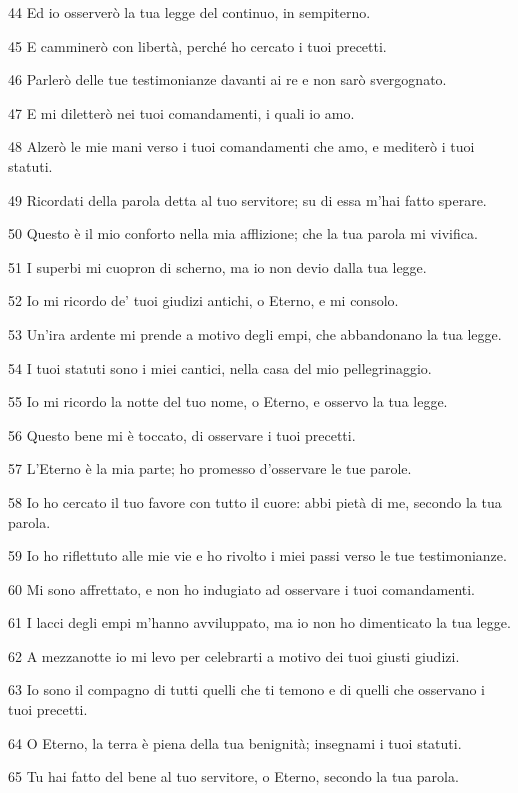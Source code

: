 \par 44 Ed io osserverò la tua legge del continuo, in sempiterno.
\par 45 E camminerò con libertà, perché ho cercato i tuoi precetti.
\par 46 Parlerò delle tue testimonianze davanti ai re e non sarò svergognato.
\par 47 E mi diletterò nei tuoi comandamenti, i quali io amo.
\par 48 Alzerò le mie mani verso i tuoi comandamenti che amo, e mediterò i tuoi statuti.
\par 49 Ricordati della parola detta al tuo servitore; su di essa m'hai fatto sperare.
\par 50 Questo è il mio conforto nella mia afflizione; che la tua parola mi vivifica.
\par 51 I superbi mi cuopron di scherno, ma io non devio dalla tua legge.
\par 52 Io mi ricordo de' tuoi giudizi antichi, o Eterno, e mi consolo.
\par 53 Un'ira ardente mi prende a motivo degli empi, che abbandonano la tua legge.
\par 54 I tuoi statuti sono i miei cantici, nella casa del mio pellegrinaggio.
\par 55 Io mi ricordo la notte del tuo nome, o Eterno, e osservo la tua legge.
\par 56 Questo bene mi è toccato, di osservare i tuoi precetti.
\par 57 L'Eterno è la mia parte; ho promesso d'osservare le tue parole.
\par 58 Io ho cercato il tuo favore con tutto il cuore: abbi pietà di me, secondo la tua parola.
\par 59 Io ho riflettuto alle mie vie e ho rivolto i miei passi verso le tue testimonianze.
\par 60 Mi sono affrettato, e non ho indugiato ad osservare i tuoi comandamenti.
\par 61 I lacci degli empi m'hanno avviluppato, ma io non ho dimenticato la tua legge.
\par 62 A mezzanotte io mi levo per celebrarti a motivo dei tuoi giusti giudizi.
\par 63 Io sono il compagno di tutti quelli che ti temono e di quelli che osservano i tuoi precetti.
\par 64 O Eterno, la terra è piena della tua benignità; insegnami i tuoi statuti.
\par 65 Tu hai fatto del bene al tuo servitore, o Eterno, secondo la tua parola.
